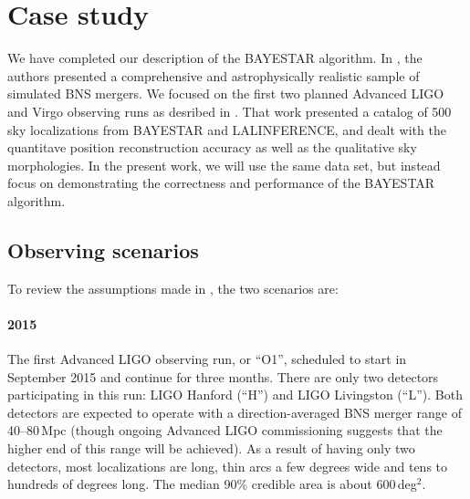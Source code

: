 \documentclass[amsmath,amssymb,aps,prx,reprint,nopreprintnumbers,nofootinbib]{revtex4-1}
\begin{document}
\section{Case study}
\label{sec:case-study}

We have completed our description of the \ac{BAYESTAR} algorithm. In \cite{FirstTwoYears}, the authors presented a comprehensive and astrophysically realistic sample of simulated \ac{BNS} mergers. We focused on the first two planned Advanced LIGO and Virgo observing runs as desribed in \cite{LIGOObservingScenarios}. That work presented a catalog of 500 sky localizations from \ac{BAYESTAR} and LALINFERENCE, and dealt with the quantitave position reconstruction accuracy as well as the qualitative sky morphologies. In the present work, we will use the same data set, but instead focus on demonstrating the correctness and performance of the \ac{BAYESTAR} algorithm.

\subsection{Observing scenarios}

To review the assumptions made in \cite{FirstTwoYears}, the two scenarios are:

\paragraph*{2015} The first Advanced \acs{LIGO} observing run, or ``O1'', scheduled to start in September 2015 and continue for three months. There are only two detectors participating in this run: \acs{LIGO} Hanford (``H'') and \acs{LIGO} Livingston (``L''). Both detectors are expected to operate with a direction\nobreakdashes-averaged \ac{BNS} merger range of 40\nobreakdashes--80\,Mpc (though ongoing Advanced \acs{LIGO} commissioning suggests that the higher end of this range will be achieved). As a result of having only two detectors, most localizations are long, thin arcs a few degrees wide and tens to hundreds of degrees long. The median 90\% credible area is about 600\,deg$^2$.
\end{document}
